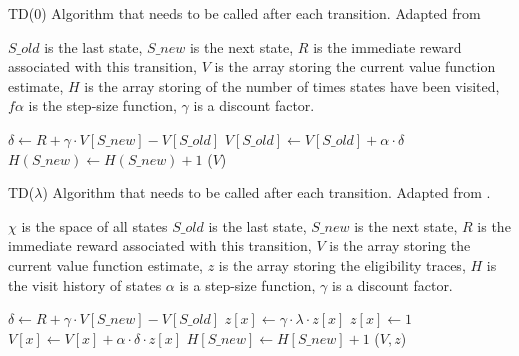 \begin{algorithm}
  \caption{
  TD(0) Algorithm that needs to be called after each transition. 
  Adapted from \textcite{Szepesvari2010ai+algorithms}
  \label{algorithm:td:0}}

  \begin{algorithmic}[1]
    \Require 
      \Statex $S\_old$ is the last state,
      \Statex $S\_new$ is the next state,
      \Statex $R$ is the immediate reward associated with this transition,
      \Statex $V$ is the array storing the current value function estimate,
      \Statex $H$ is the array storing of the number of times states have
              been visited,
      \Statex $f\alpha$ is the step-size function,
      \Statex $\gamma$ is a discount factor.

      \State $\delta \gets R + \gamma \cdot V[S\_new] - V[S\_old]$
      \State $V[S\_old] \gets V[S\_old] + \alpha \cdot \delta$
      \State $H(S\_new) \gets H(S\_new) + 1$
      \State \Return ($V$)
    \EndFunction
  \end{algorithmic}
\end{algorithm}


\begin{algorithm}
  \caption{
  TD(\(\lambda\)) Algorithm that needs to be called after each transition. 
  Adapted from \textcite{Szepesvari2010ai+algorithms}.
  \label{algorithm:td:lambda}}

  \begin{algorithmic}[1]
    \Require 
      \Statex $\chi$ is the space of all states
      \Statex $S\_old$ is the last state,
      \Statex $S\_new$ is the next state,
      \Statex $R$ is the immediate reward associated with this transition,
      \Statex $V$ is the array storing the current value function estimate,
      \Statex $z$ is the array storing the eligibility traces,
      \Statex $H$ is the visit history of states
      \Statex $\alpha$ is a step-size function,
      \Statex $\gamma$ is a discount factor.


      \State $\delta \gets R + \gamma \cdot V[S\_new] - V[S\_old]$
        \State $z[x] \gets \gamma \cdot \lambda \cdot z[x]$
          \State $z[x] \gets 1$
        \EndIf
        \State $V[x] \gets V[x] + \alpha \cdot \delta \cdot z[x]$
      \EndFor
      \State $H[S\_new] \gets H[S\_new] + 1$
      \State \Return ($V,z$)
    \EndFunction
  \end{algorithmic}

\end{algorithm}


